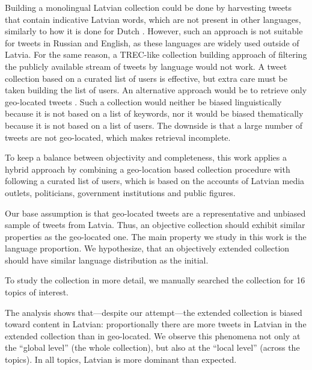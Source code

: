 \documentclass{IOS-Book-Article}
\newcommand{\hl}[1]{#1}
\begin{document}
%
Building a monolingual Latvian collection could be done by harvesting tweets that contain indicative Latvian words, which are not present in other languages, similarly to how it is done for Dutch \cite{sang2013}. However, such an approach is not suitable for tweets in Russian and English, as these languages are widely used outside of Latvia.
%
For the same reason, a TREC-like collection building approach \cite{lin2017rts} of filtering the publicly available stream of tweets by language would not work.
%
A tweet collection based on a curated list of users \cite{SANVICENTE16.465,L14-1642} is effective, but extra care must be taken building the list of users.
%
An alternative approach would be to retrieve only geo-located tweets \cite{coats_steven_2017,milajevs:2017:BUCC}. Such a collection would neither be biased linguistically because it is not based on a list of keywords, nor it would be biased thematically because it is not based on a list of users. The downside is that a large number of tweets are not geo-located, which makes retrieval incomplete.

To keep a balance between objectivity and completeness, this work applies a hybrid approach by combining a geo-location based collection procedure with following a curated list of users, which is based on the accounts of Latvian media outlets, politicians, government institutions and public figures.

Our base assumption is that geo-located tweets are a representative and unbiased sample of tweets from Latvia. Thus, an objective collection should exhibit similar properties as the geo-located one. The main property we study in this work is the language proportion. We hypothesize, that an objectively extended collection should have similar language distribution as the initial.

To study the collection in more detail, we manually searched the collection for \hl{16} topics of interest.


The analysis shows that---despite our attempt---the extended collection is biased toward content in Latvian: proportionally there are more tweets in Latvian in the extended collection than in geo-located. We observe this phenomena not only at the ``global level'' (the whole collection), but also at the ``local level'' (across the topics). \hl{In all topics, Latvian is more dominant than expected.}
\end{document}
